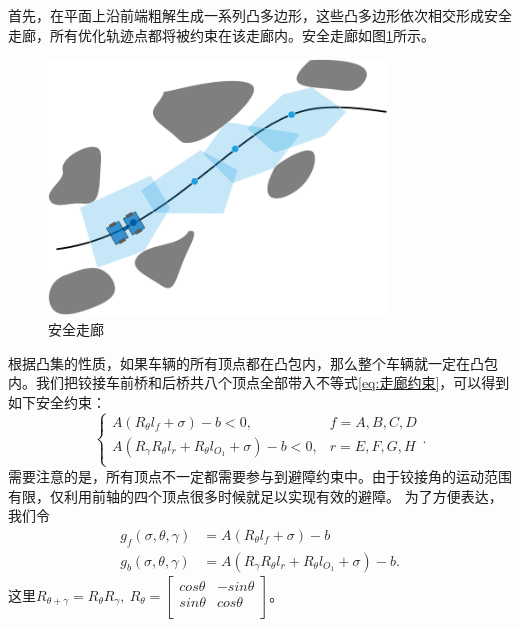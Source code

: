 \documentclass[master,academic]{ysuthesis} %
\begin{document}
		首先，在平面上沿前端粗解生成一系列凸多边形，这些凸多边形依次相交形成安全走廊，所有优化轨迹点都将被约束在该走廊内。安全走廊如图\ref{fig:安全走廊}所示。
		\begin{figure}[!ht]
			\centering
			\includegraphics[width=0.8\textwidth]{安全走廊.png}
			\caption{安全走廊}
			\label{fig:安全走廊}
		\end{figure}
		根据凸集的性质，如果车辆的所有顶点都在凸包内，那么整个车辆就一定在凸包内。我们把铰接车前桥和后桥共八个顶点全部带入不等式\ref{eq:走廊约束}，可以得到如下安全约束：
		\begin{equation}
			\left\{ \begin{matrix}
				A\left( R_{\theta}l_f+\sigma \right) -b<0,&		f=A,B,C,D\\
				A\left( R_{\gamma}R_{\theta}l_r+R_{\theta}l_{O_1}+\sigma \right) -b<0,&		r=E,F,G,H\\
			\end{matrix} \right. .
		\end{equation}
		需要注意的是，所有顶点不一定都需要参与到避障约束中。由于铰接角的运动范围有限，仅利用前轴的四个顶点很多时候就足以实现有效的避障。
		为了方便表达，我们令
		\begin{equation}
			\begin{aligned}
			g_f\left( \sigma ,\theta ,\gamma \right) &=A\left( R_{\theta}l_f+\sigma \right) -b\\
			g_b\left( \sigma ,\theta ,\gamma \right) &=A\left( R_{\gamma}R_{\theta}l_r+R_{\theta}l_{O_1}+\sigma \right) -b.
			\end{aligned}
		\end{equation}
		这里$R_{\theta +\gamma}=R_{\theta}R_{\gamma},\ R_{\theta}=\left[ \begin{matrix}
			cos\theta&		-sin\theta\\
			sin\theta&		cos\theta\\
		\end{matrix} \right] $。
\end{document}
